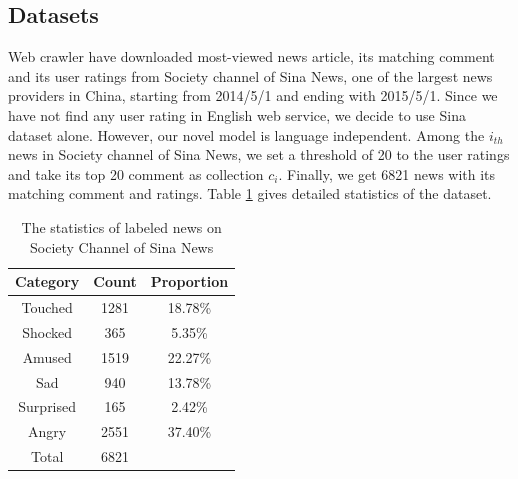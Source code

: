 \documentclass{IEEEtran}
\begin{document}
\vspace{-10pt}
\subsection{Datasets}
Web crawler have downloaded most-viewed news article, its matching comment and its user ratings from Society channel of Sina News, one of the largest news providers in China, starting from 2014/5/1 and ending with 2015/5/1. Since we have not find any user rating in English web service, we decide to use Sina dataset alone. However, our novel model is language independent. Among the $i_{th}$ news in Society channel of Sina News, we set a threshold of 20 to the user ratings and take its top 20 comment as collection $c_i$. Finally, we get 6821 news with its matching comment and ratings. Table \ref{tab:statdataset} gives detailed statistics of the dataset.

\begin{table}[!h]
\centering
\caption{The statistics of labeled news on Society Channel of Sina News}
\begin{tabular}{c c c}
\hline
Category & Count & Proportion\\
\hline
Touched & 1281 & 18.78\%\\
Shocked & 365 & 5.35\%\\
Amused & 1519 & 22.27\%\\
Sad & 940 & 13.78\%\\
Surprised & 165 & 2.42\%\\
Angry & 2551 & 37.40\%\\
Total & 6821 & \\
\hline
\end{tabular}
\label{tab:statdataset}
\end{table}

\end{document}
